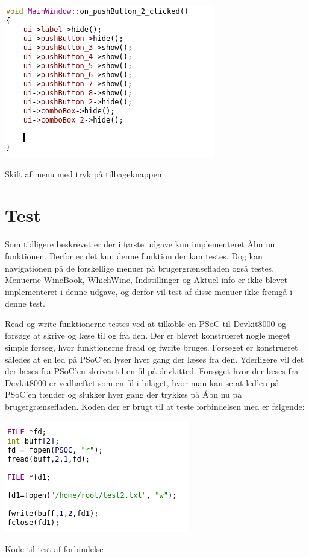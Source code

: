 \includegraphics{Billeder/tilbageKnap}
\caption{Skift af menu med tryk på tilbageknappen}


\section*{Test}

Som tidligere beskrevet er der i første udgave kun implementeret Åbn nu funktionen. Derfor er det kun denne funktion der kan testes. Dog kan navigationen på de forskellige menuer på brugergrænsefladen også testes. Menuerne WineBook, WhichWine, Indstillinger og Aktuel info er ikke blevet implementeret i denne udgave, og derfor vil test af disse menuer ikke fremgå i denne test.

Read og write funktionerne testes ved at tilkoble en PSoC til Devkit8000 og forsøge at skrive og læse til og fra den. Der er blevet konstrueret nogle meget simple forsøg, hvor funktionerne fread og fwrite bruges. Forsøget er konstrueret således at en led på PSoC'en lyser hver gang der læses fra den. Yderligere vil det der læses fra PSoC'en skrives til en fil på devkitted. Forsøget hvor der læses fra Devkit8000 er vedhæftet som en fil i bilaget, hvor man kan se at led'en på PSoC'en tænder og slukker hver gang der trykkes på Åbn nu på brugergrænsefladen. Koden der er brugt til at teste forbindelsen med er følgende:

\includegraphics{Billeder/testkode}
\caption{Kode til test af forbindelse}

